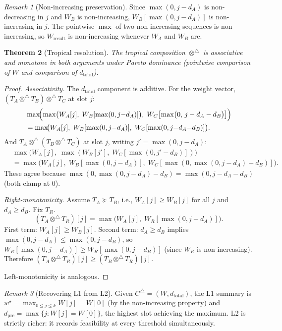 \documentclass[11pt]{article}
\theoremstyle{plain}
\newtheorem{theorem}{Theorem}[section]
\theoremstyle{definition}
\theoremstyle{remark}
\newtheorem{remark}[theorem]{Remark}
\newcommand{\optrop}{\otimes^{\triangle}}
\newcommand{\wstar}{{w^{\star}}}
\newcommand{\dtotal}{{d_{\mathrm{total}}}}
\newcommand{\dpre}[1][]{d_{\mathrm{pre}#1}}
\newcommand{\Ctrop}{{C^{\triangle}}}
\begin{document}
\begin{remark}[Non-increasing preservation]\label{rem:non-increasing}
Since $\max(0, j - d_A)$ is non-decreasing in $j$ and $W_B$ is
non-increasing, $W_B[\max(0, j - d_A)]$ is non-increasing in $j$.  The
pointwise $\max$ of two non-increasing sequences is non-increasing, so
$W_{\mathrm{result}}$ is non-increasing whenever $W_A$ and $W_B$ are.
\end{remark}

\begin{theorem}[Tropical resolution]\label{thm:tropical-resolution}
The tropical composition $\optrop$ is associative and monotone in both
arguments under Pareto dominance (pointwise comparison of $W$ and
comparison of $\dtotal$).
\end{theorem}

\begin{proof}
\emph{Associativity.}  The $\dtotal$ component is additive.
For the weight vector, $(T_A \optrop T_B) \optrop T_C$ at slot $j$:
\begin{align*}
  &\max\!\Bigl(\max\bigl(W_A[j],\; W_B[\max(0, j{-}d_A)]\bigr),\;
    W_C\bigl[\max\bigl(0,\, j - d_A - d_B\bigr)\bigr]\Bigr)\\
  &= \max\!\bigl(W_A[j],\; W_B[\max(0, j{-}d_A)],\;
    W_C[\max(0, j{-}d_A{-}d_B)]\bigr).
\end{align*}
And $T_A \optrop (T_B \optrop T_C)$ at slot $j$, writing
$j' = \max(0, j - d_A)$:
\begin{align*}
  &\max\!\bigl(W_A[j],\;
    \max(W_B[j'],\; W_C[\max(0, j'{-}d_B)])\bigr)\\
  &= \max\!\bigl(W_A[j],\; W_B[\max(0, j{-}d_A)],\;
    W_C[\max(0, \max(0, j{-}d_A){-}d_B)]\bigr).
\end{align*}
These agree because $\max(0, \max(0, j{-}d_A) - d_B)
= \max(0, j - d_A - d_B)$ (both clamp at $0$).

\emph{Right-monotonicity.}  Assume $T_A \succeq T_B$, i.e.,
$W_A[j] \ge W_B[j]$ for all $j$ and $d_A \ge d_B$.  Fix $T_R$.
\[
  (T_A \optrop T_R)[j] = \max\bigl(W_A[j],\; W_R[\max(0, j{-}d_A)]\bigr).
\]
First term: $W_A[j] \ge W_B[j]$.
Second term: $d_A \ge d_B$ implies $\max(0, j{-}d_A) \le \max(0,
j{-}d_B)$, so $W_R[\max(0, j{-}d_A)] \ge W_R[\max(0, j{-}d_B)]$
(since $W_R$ is non-increasing).  Therefore
$(T_A \optrop T_R)[j] \ge (T_B \optrop T_R)[j]$.

Left-monotonicity is analogous.
\end{proof}

\begin{remark}[Recovering L1 from L2]\label{rem:recovering-l1}
Given $\Ctrop = (W, \dtotal)$, the L1 summary is
$\wstar = \max_{0 \le j \le k} W[j] = W[0]$ (by the non-increasing
property) and $\dpre = \max\{j : W[j] = W[0]\}$, the highest slot
achieving the maximum.  L2 is strictly richer: it records feasibility
at every threshold simultaneously.
\end{remark}
\end{document}
